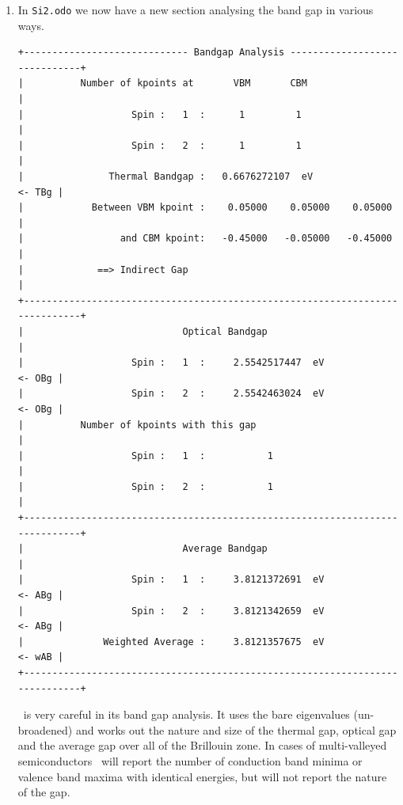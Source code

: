 \documentclass[a4paper,11pt,twoside]{book}
\begin{document}
{\begin{enumerate}
\verb#$ mpirun -np <nprocs> optados.SYSTEM.BUILD.COMMS_ARCH.x86_64 Si2#

but your MPI implementation may be different.

\item In  \verb#Si2.odo# we now have a new section analysing the band gap in various ways.
\begin{verbatim}
+----------------------------- Bandgap Analysis ------------------------------+
|          Number of kpoints at       VBM       CBM                           |
|                   Spin :   1  :      1         1                            |
|                   Spin :   2  :      1         1                            |
|               Thermal Bandgap :   0.6676272107  eV                   <- TBg |
|            Between VBM kpoint :    0.05000    0.05000    0.05000            |
|                 and CBM kpoint:   -0.45000   -0.05000   -0.45000            |
|             ==> Indirect Gap                                                |
+-----------------------------------------------------------------------------+
|                            Optical Bandgap                                  |
|                   Spin :   1  :     2.5542517447  eV                 <- OBg |
|                   Spin :   2  :     2.5542463024  eV                 <- OBg |
|          Number of kpoints with this gap                                    |
|                   Spin :   1  :           1                                 |
|                   Spin :   2  :           1                                 |
+-----------------------------------------------------------------------------+
|                            Average Bandgap                                  |
|                   Spin :   1  :     3.8121372691  eV                 <- ABg |
|                   Spin :   2  :     3.8121342659  eV                 <- ABg |
|              Weighted Average :     3.8121357675  eV                 <- wAB |
+-----------------------------------------------------------------------------+
\end{verbatim}

\optados\ is very careful in its band gap analysis. It uses the bare eigenvalues (un-broadened) and works out the nature and size of the thermal gap, optical gap and the average gap over all of the Brillouin zone. In cases of multi-valleyed semiconductors \optados\ will report the number of conduction band minima or valence band maxima with identical energies, but will not report the nature of the gap.


\end{enumerate}}
\end{document}
